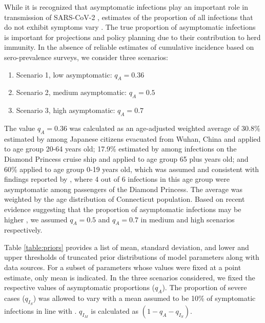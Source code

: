 \documentclass[11pt]{article}
\begin{document}
While it is recognized that asymptomatic infections play an important role in transmission of SARS-CoV-2 \citep{furukawa2020evidence}, estimates of the proportion of all infections that do not exhibit symptoms vary \citep{he2020estimation, nishiura2020estimation, mizumoto2020estimating, emery2020contribution}. The true proportion of asymptomatic infections is important for projections and policy planning due to their contribution to herd immunity. In the absence of reliable estimates of cumulative incidence based on sero-prevalence surveys, we consider three scenarios: 

\begin{enumerate}
	\item Scenario 1, low asymptomatic: $q_A = 0.36$
	\item Scenario 2, medium asymptomatic: $q_A = 0.5$
	\item Scenario 3, high asymptomatic: $q_A = 0.7$
\end{enumerate}

The value $q_A = 0.36$ was calculated as an age-adjusted weighted average of 30.8\% estimated by \citet{nishiura2020estimation} among Japanese citizens evacuated from Wuhan, China and applied to age group 20-64 years old; 17.9\% estimated by \citet{mizumoto2020estimating} among infections on the Diamond Princess cruise ship and applied to age group 65 plus years old; and 60\% applied to age group 0-19 years old, which was assumed and consistent with findings reported by \citet{russell2020estimating}, where 4 out of 6 infections in this age group were asymptomatic among passengers of the Diamond Princess. The average was weighted by the age distribution of Connecticut population. Based on recent evidence suggesting that the proportion of asymptomatic infections may be higher \citep{he2020estimation, emery2020contribution, kimball2020asymptomatic}, we assumed $q_A = 0.5$ and $q_A = 0.7$ in medium and high scenarios respectively.  

Table \ref{table:priors} provides a list of mean, standard deviation, and lower and upper thresholds of truncated prior distributions of model parameters along with data sources. For a subset of parameters whose values were fixed at a point estimate, only mean is indicated. In the three scenarios considered, we fixed the respective values of asymptomatic proportions ($q_A$). The proportion of severe cases ($q_{I_S}$) was allowed to vary with a mean assumed to be 10\% of symptomatic infections in line with \citep{verity2020estimates, bi2020epidemiology, salje2020estimating}. $q_{I_M}$ is calculated as $(1 - q_A - q_{I_S})$. 
\end{document}
